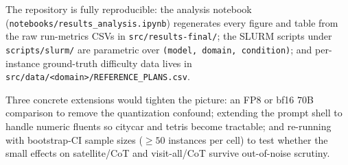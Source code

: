 The repository is fully reproducible: the analysis notebook
(\texttt{notebooks/results\_analysis.ipynb}) regenerates every figure
and table from the raw run-metrics CSVs in \texttt{src/results-final/};
the SLURM scripts under \texttt{scripts/slurm/} are parametric over
\texttt{(model, domain, condition)}; and per-instance ground-truth
difficulty data lives in \texttt{src/data/<domain>/REFERENCE\_PLANS.csv}.

Three concrete extensions would tighten the picture: an FP8 or bf16
$70$B comparison to remove the quantization confound; extending the
prompt shell to handle numeric fluents so citycar and tetris become
tractable; and re-running with bootstrap-CI sample sizes
($\geq 50$ instances per cell) to test whether the small effects on
satellite/CoT and visit-all/CoT survive out-of-noise scrutiny.
